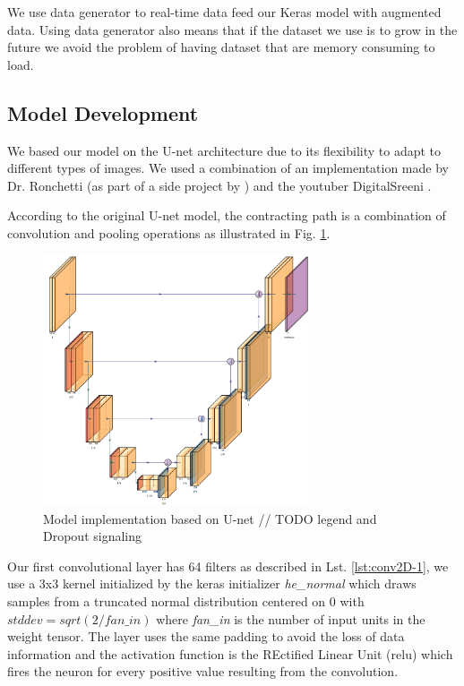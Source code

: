 \documentclass[12pt,a4paper]{scrartcl}
\begin{document}
We use data generator to real-time data feed our Keras model with augmented data. Using data generator also means that if the dataset we use is to grow in the future we avoid the problem of having dataset that are memory consuming to load.


\subsection{Model Development}

We based our model on the U-net architecture due to its flexibility to adapt to different types of images. We used a combination of an implementation made by Dr. Ronchetti (as part of a side project by \cite{Ronchetti2019}) and the youtuber DigitalSreeni \cite{DigitalSreeni}.

According to the original U-net model, the contracting path is a combination of convolution and pooling operations as illustrated in Fig. \ref{fig:model}.

\begin{figure}[H]
    \centering
    \includegraphics[width=0.7\textwidth]{./images/U-net_ThesisVersion.png}
    \caption{Model implementation based on U-net // TODO legend and Dropout signaling}
    \label{fig:model}
\end{figure}

Our first convolutional layer has 64 filters as described in Lst. \ref{lst:conv2D-1}, we use a 3x3 kernel initialized by the keras initializer \emph{he\_normal} which draws samples from a truncated normal distribution centered on 0 with $stddev = sqrt(2 / fan\_in)$ where \emph{fan\_in} is the number of input units in the weight tensor. The layer uses the same padding to avoid the loss of data information and the activation function is the REctified Linear Unit (relu) which fires the neuron for every positive value resulting from the convolution. 
\end{document}
